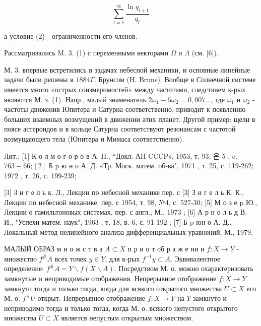 \documentclass[10pt]{article}
\begin{document}
\[

\sum_{l=1}^{\infty} \frac{\ln q_{l+1}}{q_{l}}

\]



а условие (2) - ограниченности его членов.



Рассматривались M. 3. (1) с переменными векторами $\Omega$ и $\Lambda$ (см. [6]).



М. 3. впервые встретились в задачах небесной механики, и основные линейные задачи были решены в $1884 \Gamma$. Брунсом (H. Bruns). Вообще в Солнечной системе имеется много «острых соизмеримостей» между частотами, следствием к-рых являются М. з. (1). Напр., малый знаменатель $2 \omega_{1}-5 \omega_{2}=0,007 \ldots$, где $\omega_{1}$ и $\omega_{2}$ - частоты движения Юпитера и Сатурна соответственно, приводит к появлению больших взаимных возмущений в движении әтих планет. Другой пример: щели в поясе астероидов и в кольце Сатурна соответствуют резонансам с частотой возмущающего тела (Юпитера и Мимаса соответственно).



Лит.: [1] К о л м о г о р о в А. Н., “Докл. АH CCCP», 1953, т. 93, 은 5 , c. $763-66 ;[2]$ Б p ю н о А. Д. «Тр. Моск. матем. об-ва", 1971 , т. 25, с. 119-262; 1972 , т. 26, с. 199-239;

[3] 3 и г е л ь к. Л., Лекции по небесной механике пер. с [3] З и г е л ь К. К., Лекции по небесной механике, пер. с 1954, т. 98, №4, с. 527-30; [5] М о з е p Ю., Лекции о гамильтоновых системах, пер. с англ., М., 1973 ; [6] А р н о л ь д В. И., "Успехи матем. наук", 1963 , т. 18, в. 6, с. 91 192 ; [7] Б $\mathrm{p}$ юн о А. Д., Локальный метод нелинейного анализа дифференциальных уравнений, М., 1979.



МАЛЫЙ ОБРАЗ м н о ж с т в а $A \subset X$ п р и о т об р а ж е ни и $f: X \rightarrow Y$ - множество $f^{\#} A$ всех точек $y \in Y$, для к-рых $f^{-1} y \subset A$. Эквивалентное определение: $f^{\#} A=Y \backslash f(X \backslash A)$. Посредством М. о. можно охарактеризовать замкнутые и неприводимые отображения. Непрерывное отображение $f: X \rightarrow Y$ замкнуто тогда и только тогда, когда для всякого открытого множества $U \subset X$ его М. о. $f^{\#} U$ открыт. Непрерывное отображение $f: X \rightarrow Y$ на $Y$ замкнуто и неприводимо тогда и только тогда, когда М. о. всякого непустого открытого множества $U \subset X$ является непустым открытым множеством.
\end{document}
